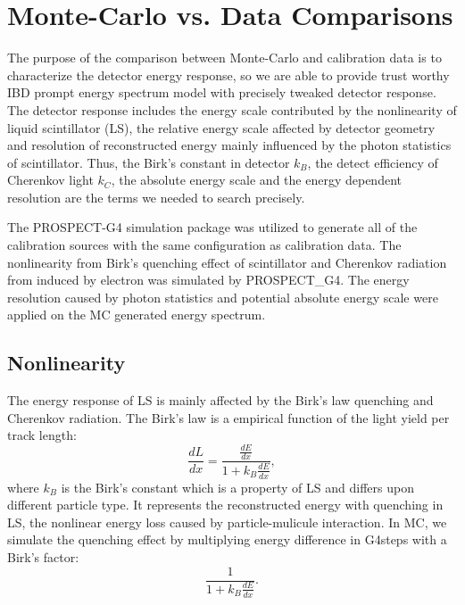 \section{Monte-Carlo vs. Data Comparisons}
The purpose of the comparison between Monte-Carlo and calibration data is to characterize the detector energy response, so we are able to provide trust worthy IBD prompt energy spectrum model with precisely tweaked detector response. 
The detector response includes the energy scale contributed by the nonlinearity of liquid scintillator (LS), the relative energy scale affected by detector geometry and resolution of reconstructed energy mainly influenced by the photon statistics of scintillator. 
Thus, the Birk’s constant in detector $k_B$, the detect efficiency of Cherenkov light $k_{C}$, the absolute energy scale and the energy dependent resolution are the terms we needed to search precisely.

The PROSPECT-G4 simulation package \cite{PG4} was utilized to generate all of the calibration sources with the same configuration as calibration data. 
The nonlinearity from Birk’s quenching effect of scintillator and Cherenkov radiation from induced by electron was simulated by PROSPECT_G4. 
The energy resolution caused by photon statistics and potential absolute energy scale were applied on the MC generated energy spectrum. 

\subsection{Nonlinearity}
The energy response of LS is mainly affected by the Birk’s law quenching and Cherenkov radiation. 
The Birk’s law is a empirical function of the light yield per track length:
\begin{equation}
    \frac{dL}{dx} = \frac{\frac{dE}{dx}}{1+k_B\frac{dE}{dx}},
\end{equation}
where $k_B$ is the Birk's constant which is a property of LS and differs upon different particle type. It represents the reconstructed energy with quenching in LS, the nonlinear energy loss caused by particle-mulicule interaction. In MC, we  simulate the quenching effect by multiplying energy difference in G4steps with a Birk's factor:
\begin{equation}
   \frac{1}{1+k_B\frac{dE}{dx}}.
   \label{eql:birks}
\end{equation}

